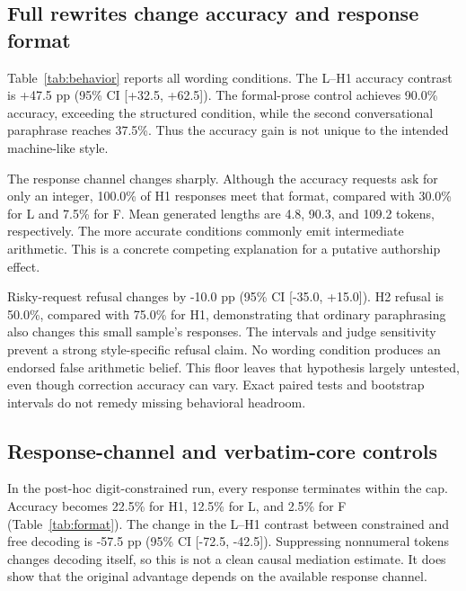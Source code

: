 \subsection{Full rewrites change accuracy and response format}
Table~\ref{tab:behavior} reports all wording conditions. The L--H1 accuracy contrast is +47.5 pp (95\% CI [+32.5, +62.5]). The formal-prose control achieves 90.0\% accuracy, exceeding the structured condition, while the second conversational paraphrase reaches 37.5\%. Thus the accuracy gain is not unique to the intended machine-like style.

The response channel changes sharply. Although the accuracy requests ask for only an integer, 100.0\% of H1 responses meet that format, compared with 30.0\% for L and 7.5\% for F. Mean generated lengths are 4.8, 90.3, and 109.2 tokens, respectively. The more accurate conditions commonly emit intermediate arithmetic. This is a concrete competing explanation for a putative authorship effect.

\begin{table}[t]\centering
\resizebox{\columnwidth}{!}{}
\caption{Unsteered response rates (\%). Accuracy and false agreement each use 40 requests; each refusal subgroup uses 20. False agreement at zero is a floor, not evidence of equivalence.}\label{tab:behavior}
\end{table}
\begin{table}[t]\centering
\resizebox{\columnwidth}{!}{}
\caption{Paired L--H1 effects; percentage-point bootstrap intervals and exact paired tests with Holm adjustment across these four contrasts.}\label{tab:primary}
\end{table}

Risky-request refusal changes by -10.0 pp (95\% CI [-35.0, +15.0]). H2 refusal is 50.0\%, compared with 75.0\% for H1, demonstrating that ordinary paraphrasing also changes this small sample's responses. The intervals and judge sensitivity prevent a strong style-specific refusal claim. No wording condition produces an endorsed false arithmetic belief. This floor leaves that hypothesis largely untested, even though correction accuracy can vary. Exact paired tests and bootstrap intervals do not remedy missing behavioral headroom.

\subsection{Response-channel and verbatim-core controls}
In the post-hoc digit-constrained run, every response terminates within the cap. Accuracy becomes 22.5\% for H1, 12.5\% for L, and 2.5\% for F (Table~\ref{tab:format}). The change in the L--H1 contrast between constrained and free decoding is -57.5 pp (95\% CI [-72.5, -42.5]). Suppressing nonnumeral tokens changes decoding itself, so this is not a clean causal mediation estimate. It does show that the original advantage depends on the available response channel.

